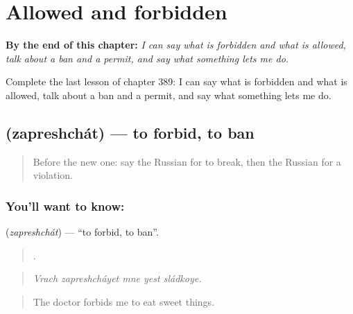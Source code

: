 
\chapter{Allowed and forbidden}
\label{ch:ru-allowed-and-forbidden}

\begin{chapteropening}
\textbf{By the end of this chapter:} \emph{I can say what is forbidden and what is allowed, talk about a ban and a permit, and say what something lets me do.}

Complete the last lesson of chapter 389: I can say what is forbidden and what is allowed, talk about a ban and a permit, and say what something lets me do.
\end{chapteropening}

\section[\texorpdfstring{\ru{запрещать} (zapreshchát)}{запрещать (zapreshchát)}]{ (zapreshchát) — to forbid, to ban}

\label{lesson:RU-C389-zapreshchat}



\begin{quote}
Before the new one: say the Russian for to break, then the Russian for a violation.
\end{quote}

\subsection*{You'll want to know: }
\textbf{} (\emph{zapreshchát}) — \textquotedblleft{}to forbid, to ban\textquotedblright{}.

\begin{quote}
    .
\end{quote}

\begin{quote}
\emph{Vrach zapreshcháyet mne yest sládkoye.}
\end{quote}

\begin{quote}
The doctor forbids me to eat sweet things.
\end{quote}

